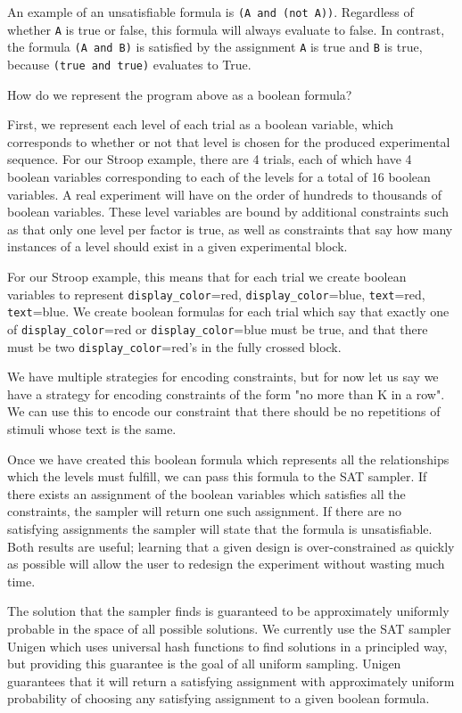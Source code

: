 An example of an unsatisfiable formula is \texttt{(A and (not A))}. Regardless of whether \texttt{A} is true or false, this formula will always evaluate to false. In contrast, the formula \texttt{(A and B)} is satisfied by the assignment \texttt{A} is true and \texttt{B} is true, because \texttt{(true and true)} evaluates to True.

How do we represent the program above as a boolean formula?

First, we represent each level of each trial as a boolean variable, which corresponds to whether or not that level is chosen for the produced experimental sequence. For our Stroop example, there are 4 trials, each of which have 4 boolean variables corresponding to each of the levels for a total of 16 boolean variables. A real experiment will have on the order of hundreds to thousands of boolean variables. These level variables are bound by additional constraints such as that only one level per factor is true, as well as constraints that say how many instances of a level should exist in a given experimental block.

For our Stroop example, this means that for each trial we create boolean variables to represent \texttt{display\_color}=red, \texttt{display\_color}=blue, \texttt{text}=red, \texttt{text}=blue. We create boolean formulas for each trial which say that exactly one of \texttt{display\_color}=red or \texttt{display\_color}=blue must be true, and that there must be two \texttt{display\_color}=red's in the fully crossed block.

We have multiple strategies for encoding constraints, but for now let us say we have a strategy for encoding constraints of the form "no more than K in a row". We can use this to encode our constraint that there should be no repetitions of stimuli whose text is the same.

Once we have created this boolean formula which represents all the relationships which the levels must fulfill, we can pass this formula to the SAT sampler. If there exists an assignment of the boolean variables which satisfies all the constraints, the sampler will return one such assignment. If there are no satisfying assignments the sampler will state that the formula is unsatisfiable. Both results are useful; learning that a given design is over-constrained as quickly as possible will allow the user to redesign the experiment without wasting much time.

The solution that the sampler finds is guaranteed to be approximately uniformly probable in the space of all possible solutions. We currently use the SAT sampler Unigen which uses universal hash functions to find solutions in a principled way, but providing this guarantee is the goal of all uniform sampling. Unigen guarantees that it will return a satisfying assignment with approximately uniform probability of choosing any satisfying assignment to a given boolean formula.

